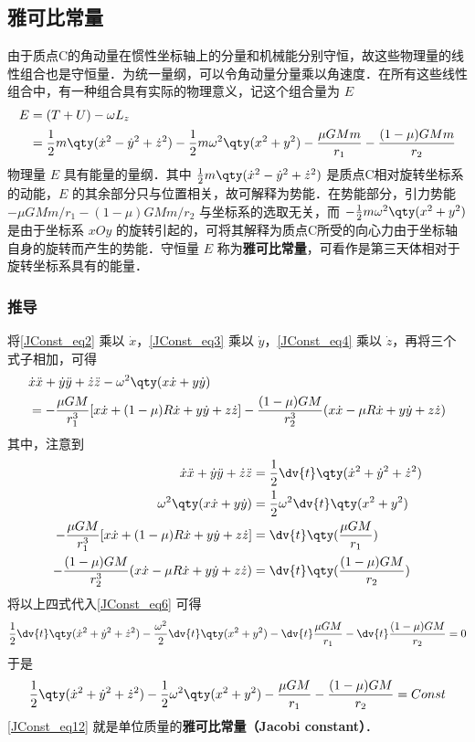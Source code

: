 \subsection{雅可比常量}
由于质点C的角动量在惯性坐标轴上的分量和机械能分别守恒，故这些物理量的线性组合也是守恒量．为统一量纲，可以令角动量分量乘以角速度．在所有这些线性组合中，有一种组合具有实际的物理意义，记这个组合量为 $E$ 
\begin{equation}%
\begin{aligned}
E &=(T+U)-\omega L_z\\
&=\frac{1}{2}m\qty(\dot{x}^2-\dot{y}^2+\dot{z}^2)-\frac{1}{2}m\omega^2\qty(x^2+y^2)-\frac{\mu GMm}{r_1}-\frac{(1-\mu)GMm}{r_2}
\end{aligned}
\end{equation}
物理量 $E$ 具有能量的量纲．其中 $\frac{1}{2}m\qty(\dot{x}^2-\dot{y}^2+\dot{z}^2)$ 是质点C相对旋转坐标系的动能，$E$ 的其余部分只与位置相关，故可解释为势能．在势能部分，引力势能 $-\mu GMm/r_1-(1-\mu)GMm/r_2$ 与坐标系的选取无关，而 $-\frac{1}{2}m\omega^2\qty(x^2+y^2)$ 是由于坐标系 $xOy$ 的旋转引起的，可将其解释为质点C所受的向心力由于坐标轴自身的旋转而产生的势能．守恒量 $E$ 称为\textbf{雅可比常量}，可看作是第三天体相对于旋转坐标系具有的能量．

\subsubsection{推导}
将\autoref{JConst_eq2} 乘以 $\dot{x}$，\autoref{JConst_eq3} 乘以 $\dot{y}$，\autoref{JConst_eq4} 乘以 $\dot{z}$，再将三个式子相加，可得
\begin{equation}\label{JConst_eq6} %
\begin{aligned}
&\dot{x} \ddot{x}+\dot{y}\ddot{y}+\dot{z}\ddot{z}-\omega^2\qty(x\dot{x}+y\dot{y})\\
&=-\frac{\mu GM}{r_1^3}[x\dot{x}+(1-\mu)R\dot{x}+y\dot{y}+z\dot{z}]-\frac{(1-\mu)GM}{r_2^3}(x\dot{x}-\mu R\dot{x}+y\dot{y}+z\dot{z})
\end{aligned}
\end{equation}
其中，注意到
\begin{align}
\dot{x}\ddot{x}+\dot{y}\ddot{y}+\dot{z}\ddot{z} &=\frac{1}{2}\dv{t}\qty(\dot{x}^2+\dot{y}^2+\dot{z}^2)\\%
\omega^2\qty(x\dot{x}+y\dot{y}) &=\frac{1}{2}\omega^2\dv{t}\qty(x^2+y^2)\\%
-\frac{\mu GM}{r_1^3}[x\dot{x}+(1-\mu)R\dot{x}+y\dot{y}+z\dot{z}] &=\dv{t}\qty(\frac{\mu GM}{r_1})\\%
-\frac{(1-\mu)GM}{r_2^3}(x\dot{x}-\mu R\dot{x}+y\dot{y}+z\dot{z}) &=\dv{t}\qty(\frac{(1-\mu) GM}{r_2})%
\end{align}
将以上四式代入\autoref{JConst_eq6} 可得
\begin{equation}%
\frac{1}{2}\dv{t}\qty(\dot{x}^2+\dot{y}^2+\dot{z}^2)-\frac{\omega^2}{2}\dv{t}\qty(x^2+y^2)-\dv{t}\frac{\mu GM}{r_1}-\dv{t}\frac{(1-\mu) GM}{r_2}=0
\end{equation}
于是
\begin{equation}\label{JConst_eq12} %
\frac{1}{2}\qty(\dot{x}^2+\dot{y}^2+\dot{z}^2)-\frac{1}{2}\omega^2\qty(x^2+y^2)-\frac{\mu GM}{r_1}-\frac{(1-\mu) GM}{r_2}=Const
\end{equation}
\autoref{JConst_eq12} 就是单位质量的\textbf{雅可比常量（Jacobi constant）}．

